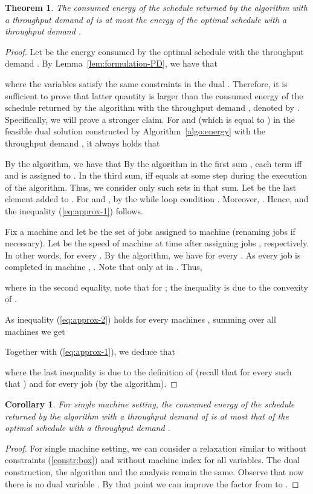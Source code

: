 \documentclass[11pt,a4paper]{article}
\newtheorem{theorem}{Theorem}
\newtheorem{corollary}{Corollary}
\begin{document}
\begin{theorem}		\label{thm:approx-main}
The consumed energy of the schedule returned by the algorithm with a throughput demand of
 is at most the energy of the optimal schedule with a throughput 
demand .
\end{theorem}
\begin{proof}
Let  be the energy consumed by the optimal schedule
with the throughput demand . By Lemma~\ref{lem:formulation-PD}, 
we have that 

where the variables  satisfy the same constraints in the dual
. Therefore, it is sufficient to prove that latter quantity is larger than
the consumed energy of the schedule returned by the algorithm with the throughput demand , denoted by .
Specifically, we will prove a stronger claim. For  and  (which is equal to ) in the 
feasible dual solution constructed by Algorithm~\ref{algo:energy} with the throughput demand , it always holds that


By the algorithm, we have that 
By the algorithm in the first sum , each term  iff
 and  is assigned to . In the third sum,  iff  equals
 at some step during the execution of the algorithm. Thus, we consider only such sets 
in that sum. Let  be the last element 
added to . For 
and , by the while loop condition 
. Moreover,
.
Hence,  and the inequality 
(\ref{eq:approx-1}) follows.

Fix a machine  and let  be the set of jobs assigned to machine  (renaming jobs if 
necessary).
Let  be the speed of machine  at time  after assigning 
jobs , respectively. In other words,  for every
. By the algorithm, we have 
 for every .
As every job  is completed in machine , .
Note that  only at  in .
Thus,

where in the second equality, note that  for ;
the inequality is due to the convexity of .

As inequality (\ref{eq:approx-2}) holds for every machines , summing over all machines we get

Together with (\ref{eq:approx-1}), we deduce that

where the last inequality is due to the definition of  
(recall that  for every  such that ) and 
 for every job  (by the algorithm).
\end{proof}

\begin{corollary}	\label{cor:single-machine}
For single machine setting, 
the consumed energy of the schedule returned by the algorithm with a throughput demand of
 is at most that of the optimal schedule with a throughput 
demand .
\end{corollary}
\begin{proof}
For single machine setting, we can consider a relaxation similar to 
without constraints (\ref{constr:box}) and without machine index  for all variables. 
The dual construction, the algorithm and the analysis remain the same. Observe that now 
there is no dual variable . By that point we can improve the factor 
from  to .
\end{proof}
\end{document}
